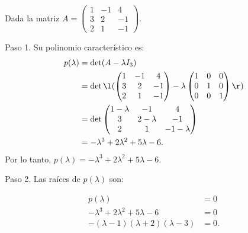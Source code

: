 \documentclass[compacto,10pt]{pubciencias-notas}
\begin{document}
\begin{ejem}\hspace{0pt} Dada la matriz $A = \begin{pmatrix}
1&-1&4 \\ 3&2&-1 \\ 2&1&-1 \end{pmatrix}$. 

Paso 1. Su polinomio característico es:
\begin{align*}
    p(\lambda)  &=  \det(A - \lambda I_{3})\\
                &=  \det\l(\begin{pmatrix}
1&-1&4 \\ 3&2&-1 \\ 2&1&-1 \end{pmatrix}-\lambda\begin{pmatrix} 1&0&0 \\ 0&1&0 \\ 0&0&1 \end{pmatrix}\r)\\
                &=  \det\begin{pmatrix} 1-\lambda &-1&4 \\ 3&2-\lambda &-1 \\ 2&1&-1-\lambda  \end{pmatrix}\\
                &= -\lambda^3+2\lambda^2 + 5\lambda - 6.\\
\end{align*}
Por lo tanto, $p(\lambda)=-\lambda^3+2\lambda^2 + 5\lambda - 6$.

Paso 2. Las raíces de $p(\lambda)$ son:


\begin{align*}
    p(\lambda)  &=  0\\
              -\lambda^3+2\lambda^2 + 5\lambda - 6 &=0 \\
               -(\lambda-1)(\lambda+2)(\lambda -3) &=0 .
\end{align*}





\end{ejem}
\end{document}
